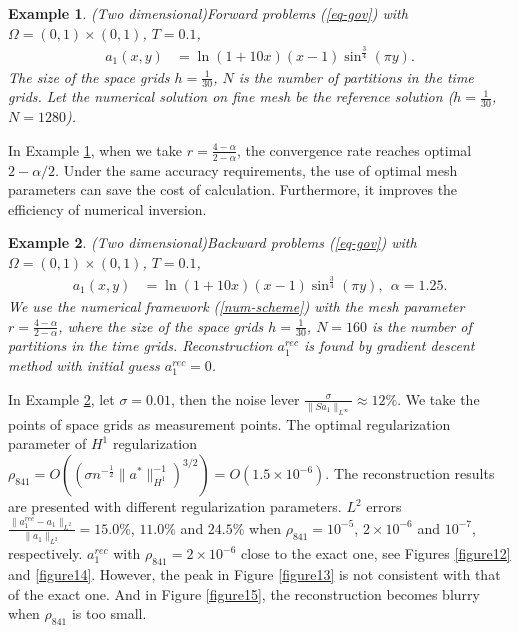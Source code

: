 \documentclass[11pt]{article}
\newtheorem{example}{Example}
\numberwithin{equation}{section}
\begin{document}
\begin{example}(Two dimensional)\label{ex3}
Forward problems (\ref{eq-gov}) with $\Omega=(0,1)\times(0,1)$, $T=0.1$,
\begin{align*}
a_1(x,y)&=\ln(1+10x)(x-1)\sin^{\frac{3}{4}}(\pi y).
\end{align*}
The size of the space grids $h=\frac{1}{30}$, $N$ is the number of partitions in the time
grids. Let the numerical solution on fine mesh be the reference solution ($h=\frac{1}{30}$,$N=1280$). 
\end{example}
In Example \ref{ex3}, when we take $r=\frac{4-\alpha}{2-\alpha}$, the convergence rate reaches optimal $2-\alpha/2$.
Under the same accuracy requirements, the use of optimal mesh parameters can save the cost of calculation. Furthermore, it improves the efficiency of numerical inversion.

\begin{example}(Two dimensional)\label{ex4}
Backward problems (\ref{eq-gov}) with $\Omega=(0,1)\times(0,1)$, $T=0.1$,
\begin{align*}
a_1(x,y)&=\ln(1+10x)(x-1)\sin^{\frac{3}{4}}(\pi y),~~\alpha=1.25.
\end{align*}
We use the numerical framework (\ref{num-scheme}) with the mesh parameter $r=\frac{4-\alpha}{2-\alpha}$, where the size of the space grids $h=\frac{1}{30}$, $N=160$ is the number of partitions in the time grids. Reconstruction $a_1^{rec}$ is found by gradient descent method with initial guess $a_1^{rec}=0$.
\end{example}

In Example \ref{ex4}, let $\sigma=0.01$, then the noise lever $\frac{\sigma}{\|Sa_1\|_{L^\infty}}\approx 12\%$.
We take the points of space grids as measurement points. The optimal regularization parameter of $H^1$ regularization $\rho_{841} = O((\sigma n^{-\frac12} \|a^*\|^{-1}_{H^1})^{3/2})=O(1.5\times10^{-6})$. The reconstruction results are presented with different regularization parameters.  $L^2$ errors $\frac{\|a_1^{rec}-a_1\|_{L^2}}{\|a_1\|_{L^2}}=15.0\%$, $11.0\%$ and $24.5\%$ when $\rho_{841}=10^{-5}$, $2\times10^{-6}$ and $10^{-7}$, respectively.
$a_1^{rec}$ with $\rho_{841}=2\times10^{-6}$ close to the exact one, see Figures \ref{figure12} and \ref{figure14}.
However, the peak in Figure \ref{figure13} is not consistent with that of the exact one. And in Figure \ref{figure15}, the reconstruction becomes blurry when $\rho_{841}$ is too small.
\end{document}
